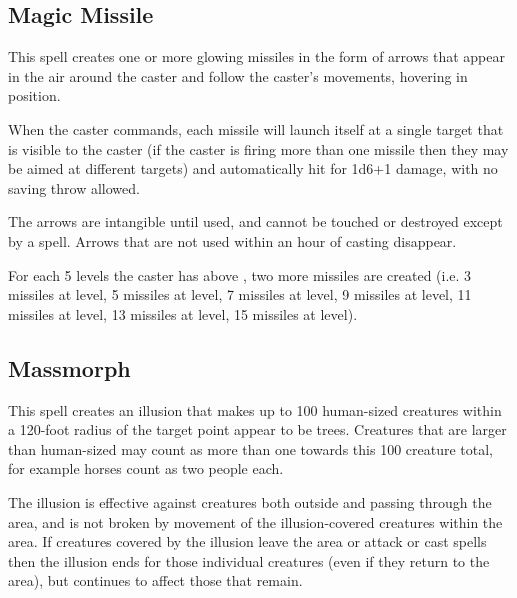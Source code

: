 \begin{multicols*}{2}
\subsection{Magic Missile}\label{spell:Magic Missile}

This spell creates one or more glowing missiles in the form of arrows that appear in the air around the caster and follow the caster’s movements, hovering in position.

When the caster commands, each missile will launch itself at a single target that is visible to the caster (if the caster is firing more than one missile then they may be aimed at different targets) and automatically hit for 1d6+1 damage, with no saving throw allowed.

The arrows are intangible until used, and cannot be touched or destroyed except by a  spell. Arrows that are not used within an hour of casting disappear.

For each 5 levels the caster has above , two more missiles are created (i.e. 3 missiles at  level, 5 missiles at  level, 7 missiles at  level, 9 missiles at  level, 11 missiles at  level, 13 missiles at  level, 15 missiles at  level).

\subsection{Massmorph}\label{spell:Massmorph}


This spell creates an illusion that makes up to 100 human-sized creatures within a 120-foot radius of the target point appear to be trees. Creatures that are larger than human-sized may count as more than one towards this 100 creature total, for example horses count as two people each.

The illusion is effective against creatures both outside and passing through the area, and is not broken by movement of the illusion-covered creatures within the area. If creatures covered by the illusion leave the area or attack or cast spells then the illusion ends for those individual creatures (even if they return to the area), but continues to affect those that remain.


\end{multicols*}

